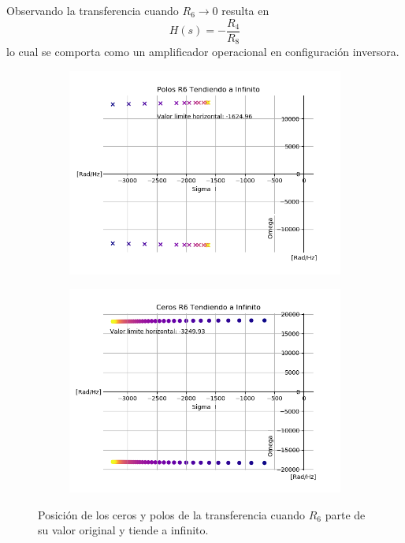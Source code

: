 Observando la transferencia cuando $R_6 \rightarrow 0$ resulta en
\begin{equation}
H(s)=-\frac{R_4}{R_8}
\label{ec:r6a0}
\end{equation}
lo cual se comporta como un amplificador operacional en configuración inversora.

\begin{figure}[H]
	\centering
	\begin{subfigure}[t]{0.49\textwidth}
	\hspace*{-2cm}
	\centering
		\includegraphics[width=1.1\textwidth]{Imagenes/polosr6ainf.png}
	\end{subfigure}
	\begin{subfigure}[t]{0.49\textwidth}
	\centering
		\includegraphics[width=1.1\textwidth]{Imagenes/cerosr6ainf.png}
	\end{subfigure}
	\caption{Posición de los ceros y polos de la transferencia cuando $R_6$ parte de su valor original y tiende a infinito.}
	\label{fig:r6ainf}
\end{figure}

